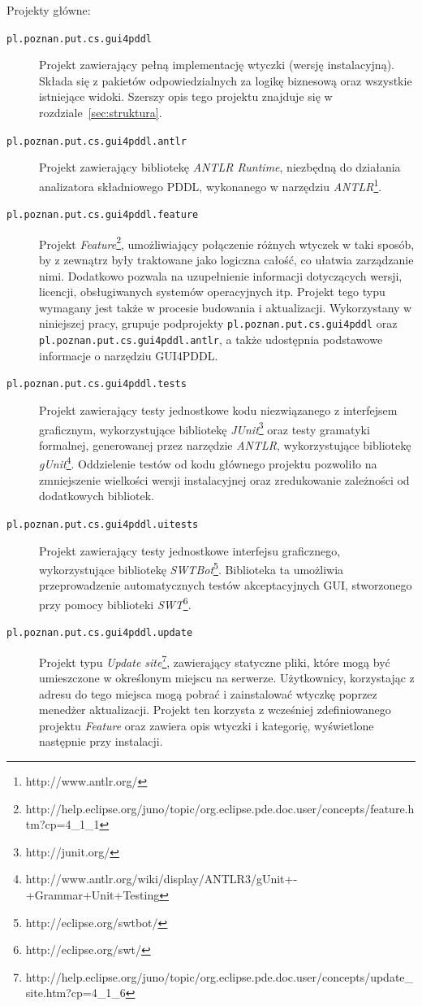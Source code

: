 Projekty główne:
\begin{description}
\item [\texttt{pl.poznan.put.cs.gui4pddl}] Projekt zawierający pełną implementację wtyczki (wersję instalacyjną). Składa się z pakietów odpowiedzialnych za logikę biznesową oraz wszystkie istniejące widoki. Szerszy opis tego projektu znajduje się w rozdziale~\ref{sec:struktura}.
\item [\texttt{pl.poznan.put.cs.gui4pddl.antlr}] Projekt zawierający bibliotekę \emph{ANTLR Runtime}, niezbędną do działania analizatora składniowego PDDL, wykonanego w narzędziu \emph{ANTLR}\footnote{http://www.antlr.org/}.
\item [\texttt{pl.poznan.put.cs.gui4pddl.feature}] Projekt \emph{Feature}\footnote{http://help.eclipse.org/juno/topic/org.eclipse.pde.doc.user/concepts/feature.htm?cp=4\_1\_1}, umożliwiający połączenie różnych wtyczek w taki sposób, by z zewnątrz były traktowane jako logiczna całość, co ułatwia zarządzanie nimi. Dodatkowo pozwala na uzupełnienie informacji dotyczących wersji, licencji, obsługiwanych systemów operacyjnych itp. Projekt tego typu wymagany jest także w procesie budowania i aktualizacji. Wykorzystany w niniejszej pracy, grupuje podprojekty \texttt{pl.poznan.put.cs.gui4pddl} oraz \texttt{pl.poznan.put.cs.gui4pddl.antlr}, a także udostępnia podstawowe informacje o narzędziu GUI4PDDL.
\item [\texttt{pl.poznan.put.cs.gui4pddl.tests}] Projekt zawierający testy jednostkowe kodu niezwiązanego z interfejsem graficznym, wykorzystujące bibliotekę \emph{JUnit}\footnote{http://junit.org/} oraz testy gramatyki formalnej, generowanej przez narzędzie \emph{ANTLR}, wykorzystujące bibliotekę \emph{gUnit}\footnote{http://www.antlr.org/wiki/display/ANTLR3/gUnit+-+Grammar+Unit+Testing}.  Oddzielenie testów od kodu głównego projektu pozwoliło na zmniejszenie wielkości wersji instalacyjnej oraz zredukowanie zależności od dodatkowych bibliotek.
\item [\texttt{pl.poznan.put.cs.gui4pddl.uitests}] Projekt zawierający testy jednostkowe interfejsu graficznego, wykorzystujące bibliotekę \emph{SWTBot}\footnote{http://eclipse.org/swtbot/}. Biblioteka ta umożliwia przeprowadzenie automatycznych testów akceptacyjnych GUI, stworzonego przy pomocy biblioteki \emph{SWT}\footnote{http://eclipse.org/swt/}.
\item [\texttt{pl.poznan.put.cs.gui4pddl.update}] Projekt typu \emph{Update site}\footnote{http://help.eclipse.org/juno/topic/org.eclipse.pde.doc.user/concepts/update\_site.htm?cp=4\_1\_6}, zawierający statyczne pliki, które mogą być umieszczone w określonym miejscu na serwerze. Użytkownicy, korzystając z adresu do tego miejsca mogą pobrać i zainstalować wtyczkę poprzez menedżer aktualizacji. Projekt ten korzysta z wcześniej zdefiniowanego projektu \emph{Feature} oraz zawiera opis wtyczki i kategorię, wyświetlone następnie przy instalacji.
\end{description}

